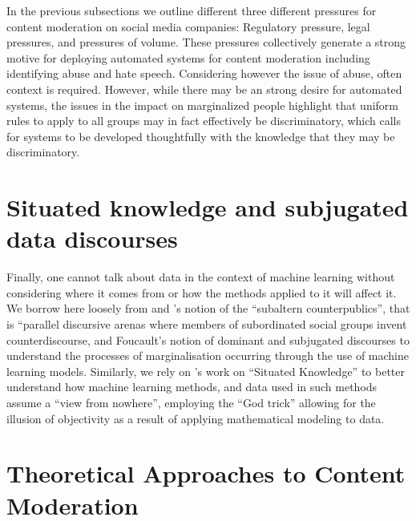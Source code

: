 In the previous subsections we outline different three different pressures for content moderation on social media companies: Regulatory pressure, legal pressures, and pressures of volume. These pressures collectively generate a strong motive for deploying automated systems for content moderation including identifying abuse and hate speech. Considering however the issue of abuse, often context is required. However, while there may be an strong desire for automated systems, the issues in the impact on marginalized people highlight that uniform rules to apply to all groups may in fact effectively be discriminatory, which calls for systems to be developed thoughtfully with the knowledge that they may be discriminatory.


\section{Situated knowledge and subjugated data discourses} 
Finally, one cannot talk about data in the context of machine learning without considering where it comes from or how the methods applied to it will affect it. We borrow here loosely from \cite{Fraser:1989} and \cite{Spivak}'s notion of the ``subaltern counterpublics'', that is ``parallel discursive arenas where members of subordinated social groups invent counterdiscourse, and Foucault's notion of dominant and subjugated discourses to understand the processes of marginalisation occurring through the use of machine learning models. Similarly, we rely on \cite{Haraway:1988}'s work on ``Situated Knowledge'' to better understand how machine learning methods, and data used in such methods assume a ``view from nowhere'', employing the ``God trick'' allowing for the illusion of objectivity as a result of applying mathematical modeling to data.

\cite{Harway:1988,Gitelman:2013,Gitelman-Jackson:2013,Mohanty:1984}

\section{Theoretical Approaches to Content Moderation}

